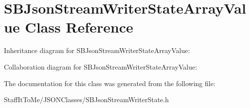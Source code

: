 \hypertarget{interface_s_b_json_stream_writer_state_array_value}{
\section{\-S\-B\-Json\-Stream\-Writer\-State\-Array\-Value \-Class \-Reference}
\label{interface_s_b_json_stream_writer_state_array_value}
}


\-Inheritance diagram for \-S\-B\-Json\-Stream\-Writer\-State\-Array\-Value\-:


\-Collaboration diagram for \-S\-B\-Json\-Stream\-Writer\-State\-Array\-Value\-:


\-The documentation for this class was generated from the following file\-:\begin{DoxyCompactItemize}
\item 
\-Staff\-It\-To\-Me/\-J\-S\-O\-N\-Classes/\-S\-B\-Json\-Stream\-Writer\-State.\-h\end{DoxyCompactItemize}
